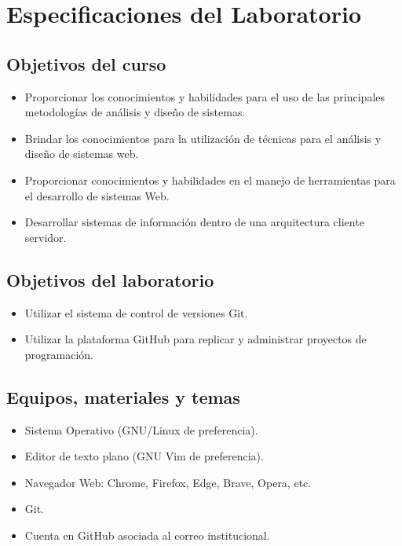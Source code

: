 \documentclass{article}
\begin{document}
\maketitle

\section{Especificaciones del Laboratorio}
\subsection{Objetivos del curso}
\begin{itemize}
    \item Proporcionar los conocimientos y habilidades para el uso de las principales metodologías de análisis y diseño de sistemas.
    \item Brindar los conocimientos para la utilización de técnicas para el análisis y diseño de sistemas web.
    \item Proporcionar conocimientos y habilidades en el manejo de herramientas para el desarrollo de sistemas Web.
    \item Desarrollar sistemas de información dentro de una arquitectura cliente servidor.
\end{itemize}

\subsection{Objetivos del laboratorio}
\begin{itemize}
    \item Utilizar el sistema de control de versiones Git.
    \item Utilizar la plataforma GitHub para replicar y administrar proyectos de programación.
\end{itemize}

\subsection{Equipos, materiales y temas}
\begin{itemize}
    \item Sistema Operativo (GNU/Linux de preferencia).
    \item Editor de texto plano (GNU Vim de preferencia).
    \item Navegador Web: Chrome, Firefox, Edge, Brave, Opera, etc.
    \item Git.
    \item Cuenta en GitHub asociada al correo institucional.
\end{itemize}
\end{document}

